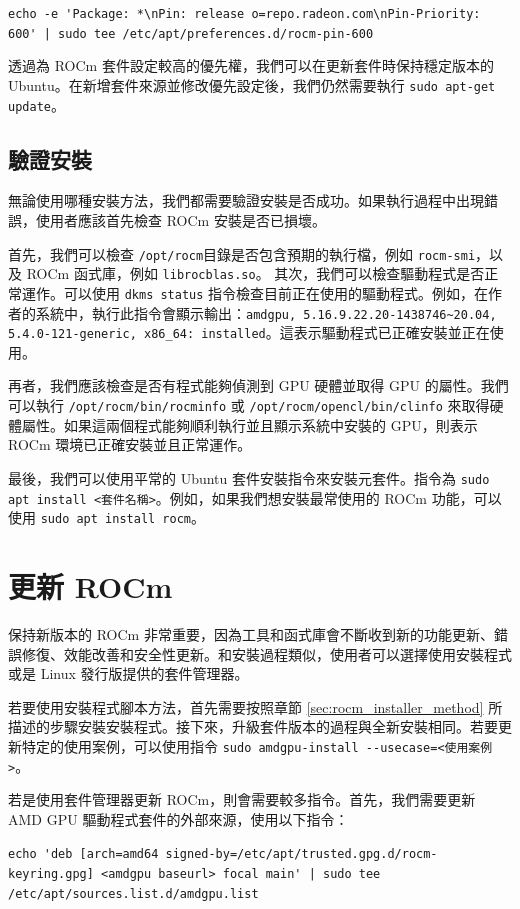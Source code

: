 \lstinline!echo -e 'Package: *\nPin: release o=repo.radeon.com\nPin-Priority: 600' | sudo tee /etc/apt/preferences.d/rocm-pin-600! 

透過為 ROCm 套件設定較高的優先權，我們可以在更新套件時保持穩定版本的 Ubuntu。在新增套件來源並修改優先設定後，我們仍然需要執行 \lstinline|sudo apt-get update|。


\subsection{驗證安裝}
無論使用哪種安裝方法，我們都需要驗證安裝是否成功。如果執行過程中出現錯誤，使用者應該首先檢查 ROCm 安裝是否已損壞。

首先，我們可以檢查 \lstinline|/opt/rocm|目錄是否包含預期的執行檔，例如 \lstinline|rocm-smi|，以及 ROCm 函式庫，例如 \lstinline|librocblas.so|。
其次，我們可以檢查驅動程式是否正常運作。可以使用 \lstinline|dkms status| 指令檢查目前正在使用的驅動程式。例如，在作者的系統中，執行此指令會顯示輸出：\lstinline|amdgpu, 5.16.9.22.20-1438746~20.04, 5.4.0-121-generic, x86_64: installed|。這表示驅動程式已正確安裝並正在使用。

再者，我們應該檢查是否有程式能夠偵測到 GPU 硬體並取得 GPU 的屬性。我們可以執行 \lstinline|/opt/rocm/bin/rocminfo| 或 \lstinline|/opt/rocm/opencl/bin/clinfo| 來取得硬體屬性。如果這兩個程式能夠順利執行並且顯示系統中安裝的 GPU，則表示 ROCm 環境已正確安裝並且正常運作。

最後，我們可以使用平常的 Ubuntu 套件安裝指令來安裝元套件。指令為 \lstinline|sudo apt install <套件名稱>|。例如，如果我們想安裝最常使用的 ROCm 功能，可以使用 \lstinline|sudo apt install rocm|。


\section{更新 ROCm}
保持新版本的 ROCm 非常重要，因為工具和函式庫會不斷收到新的功能更新、錯誤修復、效能改善和安全性更新。和安裝過程類似，使用者可以選擇使用安裝程式或是 Linux 發行版提供的套件管理器。

若要使用安裝程式腳本方法，首先需要按照章節 \ref{sec:rocm_installer_method} 所描述的步驟安裝安裝程式。接下來，升級套件版本的過程與全新安裝相同。若要更新特定的使用案例，可以使用指令 \lstinline|sudo amdgpu-install --usecase=<使用案例>|。

若是使用套件管理器更新 ROCm，則會需要較多指令。首先，我們需要更新 AMD GPU 驅動程式套件的外部來源，使用以下指令：

\lstinline!echo 'deb [arch=amd64 signed-by=/etc/apt/trusted.gpg.d/rocm-keyring.gpg] <amdgpu baseurl> focal main' | sudo tee /etc/apt/sources.list.d/amdgpu.list!

